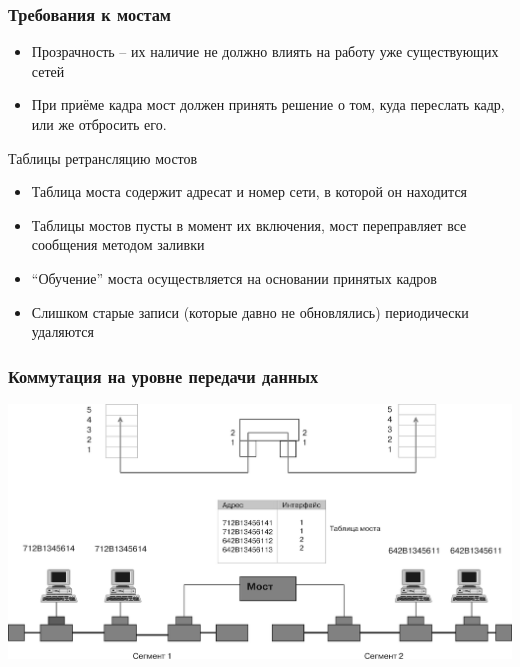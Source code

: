 \documentclass[utf8]{beamer}
\begin{document}
\begin{frame}
\frametitle{Требования к мостам}
\begin{itemize}
\item Прозрачность -- их наличие не должно влиять на работу уже существующих сетей
\item При приёме кадра мост должен принять решение о том, куда переслать кадр, или же отбросить его.
\end{itemize}
\begin{block}{Таблицы ретрансляцию мостов}
\begin{itemize}
\item Таблица моста содержит адресат и номер сети, в которой он находится
\item Таблицы мостов пусты в момент их включения, мост переправляет все сообщения методом заливки
\item ``Обучение'' моста осуществляется на основании принятых кадров
\item Слишком старые записи (которые давно не обновлялись) периодически удаляются

\end{itemize}
\end{block}
\end{frame}
\begin{frame}
\frametitle{Коммутация на уровне передачи данных}
\begin{center}
\includegraphics[width=\textwidth]{pic/bridge.jpg}
\end{center}
\end{frame}
\end{document}
